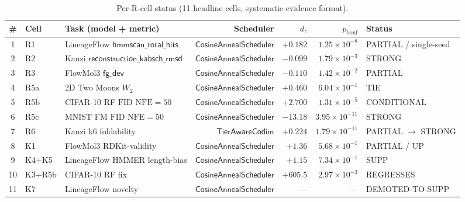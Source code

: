 \documentclass[journal,twocolumn,final]{IEEEtran}
\newcommand{\NFE}{\mathrm{NFE}}
\newcommand{\pbonf}{p_{\mathrm{bonf}}}
\newcommand{\dz}{d_z}
\newcommand{\wftwo}{W_2}
\newcommand{\FID}{\mathrm{FID}}
\begin{document}
\begin{table}[ht]
\centering
\caption{Per-R-cell status (11 headline cells, systematic-evidence format).}
\label{tab:status}
\small
\begin{tabular}{cllrrrl}
\toprule
\# & \textbf{Cell} & \textbf{Task (model + metric)} & \textbf{Scheduler} & $\dz$ & $\pbonf$ & \textbf{Status} \\
\midrule
1 & R1  & LineageFlow $\mathsf{hmmscan\_total\_hits}$ & $\mathsf{CosineAnnealScheduler}$ & $+0.182$  & $1.25\!\times\!10^{-8}$  & PARTIAL / single-seed \\
2 & R2  & Kanzi $\mathsf{reconstruction\_kabsch\_rmsd}$ & $\mathsf{CosineAnnealScheduler}$ & $-0.099$  & $1.79\!\times\!10^{-3}$  & STRONG \\
3 & R3  & FlowMol3 $\mathsf{fg\_dev}$                & $\mathsf{CosineAnnealScheduler}$ & $-0.110$  & $1.42\!\times\!10^{-2}$  & PARTIAL \\
4 & R5a & 2D Two Moons $\wftwo$                       & $\mathsf{CosineAnnealScheduler}$ & $+0.460$  & $6.04\!\times\!10^{-1}$  & TIE \\
5 & R5b & CIFAR-10 RF $\FID$ $\NFE=50$                & $\mathsf{CosineAnnealScheduler}$ & $+2.700$  & $1.31\!\times\!10^{-5}$  & CONDITIONAL \\
6 & R5c & MNIST FM $\FID$ $\NFE=50$                   & $\mathsf{CosineAnnealScheduler}$ & $-13.18$  & $3.95\!\times\!10^{-11}$ & STRONG \\
7 & R6  & Kanzi k6 foldability                        & $\mathsf{TierAwareCodim}$         & $+0.224$  & $1.79\!\times\!10^{-11}$ & PARTIAL $\to$ STRONG \\
8 & K1  & FlowMol3 RDKit-validity                     & $\mathsf{CosineAnnealScheduler}$ & $+1.36$   & $5.68\!\times\!10^{-1}$  & PARTIAL / UP \\
9 & K4+K5 & LineageFlow HMMER length-bias             & $\mathsf{CosineAnnealScheduler}$ & $+1.15$   & $7.34\!\times\!10^{-1}$  & SUPP \\
10 & K3+R5b & CIFAR-10 RF fix                        & $\mathsf{CosineAnnealScheduler}$ & $+605.5$  & $2.97\!\times\!10^{-3}$  & REGRESSES \\
11 & K7  & LineageFlow novelty                         & $\mathsf{CosineAnnealScheduler}$ & ---        & ---                       & DEMOTED-TO-SUPP \\
\bottomrule
\end{tabular}
\end{table}
\end{document}
